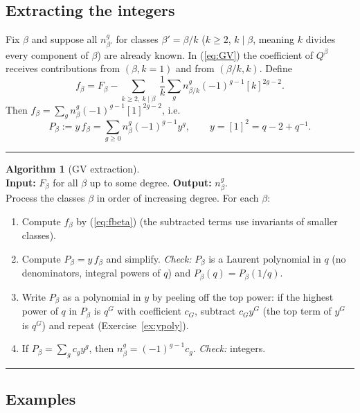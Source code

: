 \documentclass[11pt]{article}
\theoremstyle{plain}
\theoremstyle{definition}
\newtheorem{algo}{Algorithm}
\theoremstyle{remark}
\newenvironment{algobox}{\par\medskip\noindent\begin{minipage}{\linewidth}\hrule\smallskip}{\smallskip\hrule\end{minipage}\par\medskip}
\begin{document}
\subsection{Extracting the integers}

Fix $\beta$ and suppose all $n^g_{\beta'}$ for classes $\beta'=\beta/k$ ($k\ge2$, $k\mid\beta$, meaning
$k$ divides every component of $\beta$) are already known. In (\ref{eq:GV}) the coefficient of
$Q^\beta$ receives contributions from $(\beta,k=1)$ and from $(\beta/k,k)$. Define
\begin{equation}\label{eq:fbeta}
f_\beta=F_\beta-\sum_{k\ge2,\ k\mid\beta}\ \frac1k\sum_gn^g_{\beta/k}(-1)^{g-1}[k]^{2g-2}.
\end{equation}
Then $f_\beta=\sum_gn^g_\beta(-1)^{g-1}[1]^{2g-2}$, i.e.
\begin{equation}\label{eq:Pbeta}
P_\beta:=y\,f_\beta=\sum_{g\ge0}n^g_\beta(-1)^{g-1}y^g,\qquad y=[1]^2=q-2+q^{-1}.
\end{equation}

\begin{algobox}
\begin{algo}[GV extraction]\label{alg:gv}\ \\
\textbf{Input:} $F_\beta$ for all $\beta$ up to some degree. \textbf{Output:} $n^g_\beta$.\\
Process the classes $\beta$ in order of increasing degree. For each $\beta$:
\begin{enumerate}
\item Compute $f_\beta$ by (\ref{eq:fbeta}) (the subtracted terms use invariants of smaller classes).
\item Compute $P_\beta=y\,f_\beta$ and simplify. \textit{Check:} $P_\beta$ is a Laurent polynomial
in $q$ (no denominators, integral powers of $q$) and $P_\beta(q)=P_\beta(1/q)$.
\item Write $P_\beta$ as a polynomial in $y$ by peeling off the top power: if the highest power
of $q$ in $P_\beta$ is $q^G$ with coefficient $c_G$, subtract $c_Gy^G$ (the top term of $y^G$ is $q^G$)
and repeat (Exercise~\ref{ex:ypoly}).
\item If $P_\beta=\sum_gc_gy^g$, then $n^g_\beta=(-1)^{g-1}c_g$. \textit{Check:} integers.
\end{enumerate}
\end{algo}
\end{algobox}

\subsection{Examples}
\end{document}
